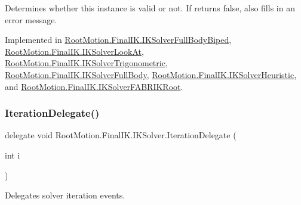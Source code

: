 Determines whether this instance is valid or not. If returns false, also fills in an error message. 



Implemented in \mbox{\hyperlink{class_root_motion_1_1_final_i_k_1_1_i_k_solver_full_body_biped_a3a3db44c5ef5d7a508492225ae161f10}{Root\+Motion.\+Final\+I\+K.\+I\+K\+Solver\+Full\+Body\+Biped}}, \mbox{\hyperlink{class_root_motion_1_1_final_i_k_1_1_i_k_solver_look_at_ae5ed12132b2966c70cd02055844fe20d}{Root\+Motion.\+Final\+I\+K.\+I\+K\+Solver\+Look\+At}}, \mbox{\hyperlink{class_root_motion_1_1_final_i_k_1_1_i_k_solver_trigonometric_a96e4567149a2309a7d1554ec6c8b3e16}{Root\+Motion.\+Final\+I\+K.\+I\+K\+Solver\+Trigonometric}}, \mbox{\hyperlink{class_root_motion_1_1_final_i_k_1_1_i_k_solver_full_body_a52e5312dcea8441bec26f0a9c2bf54f2}{Root\+Motion.\+Final\+I\+K.\+I\+K\+Solver\+Full\+Body}}, \mbox{\hyperlink{class_root_motion_1_1_final_i_k_1_1_i_k_solver_heuristic_a81daa8bcbfe7cf858f2e439de4ade437}{Root\+Motion.\+Final\+I\+K.\+I\+K\+Solver\+Heuristic}}, and \mbox{\hyperlink{class_root_motion_1_1_final_i_k_1_1_i_k_solver_f_a_b_r_i_k_root_aadae32713090c6aa827af13781f4a3da}{Root\+Motion.\+Final\+I\+K.\+I\+K\+Solver\+F\+A\+B\+R\+I\+K\+Root}}.

\mbox{\label{class_root_motion_1_1_final_i_k_1_1_i_k_solver_ae3da6a8ccd8224ce56d15c4da5cd1ef7}} 
\subsubsection{\texorpdfstring{Iteration\+Delegate()}{IterationDelegate()}}
{\footnotesize\ttfamily delegate void Root\+Motion.\+Final\+I\+K.\+I\+K\+Solver.\+Iteration\+Delegate (\begin{DoxyParamCaption}\item[{int}]{i }\end{DoxyParamCaption})}



Delegates solver iteration events. 

\mbox{\label{class_root_motion_1_1_final_i_k_1_1_i_k_solver_ac62ff5216c823725d5f9b03e18de9e5a}} 
